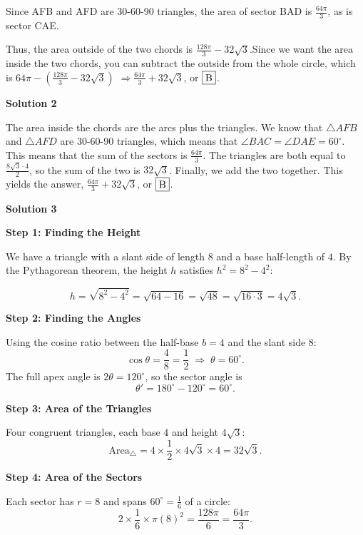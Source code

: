 \begin{enumerate}
 Since AFB and AFD are 30-60-90 triangles, the area of sector BAD is $\frac{64\pi}{3}$, as is sector CAE.

 Thus, the area outside of the two chords is $\frac{128\pi}{3}-32\sqrt{3}$.Since we want the area inside the two chords, you can subtract the outside from the whole circle, which is $64\pi-(\frac{128\pi}{3}-32\sqrt{3})$ $\Rightarrow \frac{64\pi}{3}+32\sqrt{3}$, or $\fbox{B}$.

 


 



\textbf{Solution 2}

The area inside the chords are the arcs plus the triangles. We know that $\triangle AFB$ and $\triangle AFD$ are 30-60-90 triangles, which means that $\angle BAC = \angle DAE = 60^\circ$. This means that the sum of the sectors is $\frac{64 \pi} {3}$. The triangles are both equal to $\frac{8\sqrt{3} \cdot 4} {2}$, so the sum of the two is $32\sqrt{3}$. Finally, we add the two together. This yields the answer, $\frac{64\pi}{3}+32\sqrt{3}$, or $\fbox{B}$.

 


 



\textbf{Solution 3}

\textbf{Step 1: Finding the Height}

 We have a triangle with a slant side of length $8$ and a base half-length of $4$. By the Pythagorean theorem, the height $h$ satisfies $h^2 = 8^2 - 4^2$:

 
 \[h = \sqrt{8^2 - 4^2} = \sqrt{64 - 16} = \sqrt{48} = \sqrt{16 \cdot 3} = 4\sqrt{3}.\]

 \textbf{Step 2: Finding the Angles}

 Using the cosine ratio between the half-base $b = 4$ and the slant side $8$:
 \[\cos\theta = \frac{4}{8} = \frac{1}{2} \;\Longrightarrow\; \theta = 60^\circ.\]The full apex angle is $2\theta = 120^\circ$, so the sector angle is
 \[\theta' = 180^\circ - 120^\circ = 60^\circ.\]

 \textbf{Step 3: Area of the Triangles}

 Four congruent triangles, each base $4$ and height $4\sqrt{3}$:
 \[\text{Area}_\triangle = 4 \times \frac{1}{2} \times 4\sqrt{3} \times 4 = 32\sqrt{3}.\]

 \textbf{Step 4: Area of the Sectors}

 Each sector has $r = 8$ and spans $60^\circ = \frac{1}{6}$ of a circle:
 \[2 \times \frac{1}{6} \times \pi (8)^2 = \frac{128\pi}{6} = \frac{64\pi}{3}.\]


\end{enumerate}
